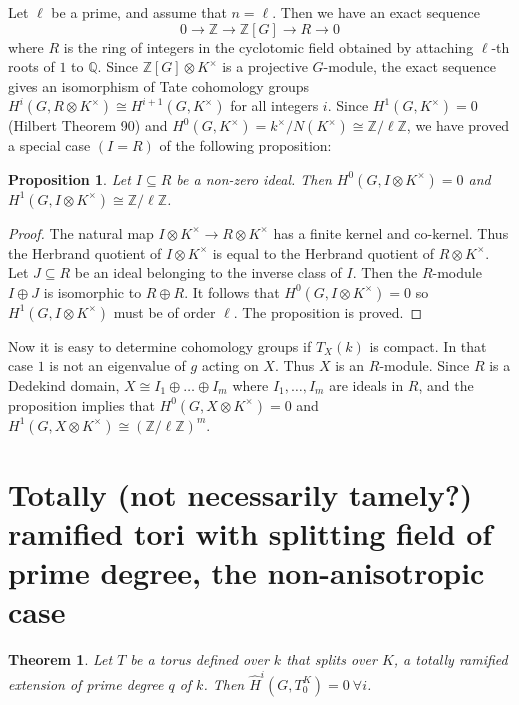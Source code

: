 \documentclass[11pt]{amsart}
\theoremstyle{plain}
\newtheorem{theorem}[enumi]{Theorem}
\newtheorem{proposition}[enumi]{Proposition}
\begin{document}
Let $\ell$ be a prime, and assume that $n=\ell$. Then we have an exact sequence
\[
0 \rightarrow \mathbb Z \rightarrow \mathbb Z[G]\rightarrow R \rightarrow 0
\]
where $R$ is the ring of integers in the cyclotomic field obtained by attaching $\ell$-th roots
of $1$ to $\mathbb Q$. Since $\mathbb Z[G]\otimes K^{\times}$ is a projective $G$-module, the exact sequence
gives an isomorphism of Tate cohomology
groups $H^i(G, R\otimes K^{\times})\cong H^{i+1}(G,K^{\times})$ for all integers $i$. Since
$H^1(G,K^{\times})=0$ (Hilbert Theorem 90) and $H^{0}(G,K^{\times})=k^{\times}/N(K^{\times})
\cong \mathbb Z/\ell\mathbb Z$, we have proved a special case $(I=R)$ of the following
proposition:

\begin{proposition} Let $I\subseteq R$ be a non-zero ideal. Then $H^0(G,I\otimes K^{\times})=0$
and $H^1(G,I\otimes K^{\times})\cong \mathbb Z/\ell\mathbb Z$.
\end{proposition}
\begin{proof} The natural map $I\otimes K^{\times}\rightarrow R\otimes K^{\times}$ has a
finite kernel and co-kernel. Thus the Herbrand quotient of
$I\otimes K^{\times}$ is equal to the Herbrand quotient of $R \otimes K^{\times}$. Let
$J\subseteq R$ be an ideal belonging to the inverse class of $I$. Then the $R$-module
$I\oplus J$ is isomorphic to $R\oplus R$. It follows that $H^0(G,I\otimes K^{\times})=0$
so $H^1(G,I\otimes K^{\times})$ must be of order $\ell$. The proposition is proved.
\end{proof}

Now it is easy to determine cohomology groups if $T_X(k)$ is compact. In that case $1$ is not
an eigenvalue of $g$ acting on $X$. Thus $X$ is an $R$-module. Since $R$ is a Dedekind
domain, $X\cong I_1\oplus \ldots \oplus I_m$ where $I_1, \ldots, I_m$ are ideals in $R$, and
the proposition implies that $H^0(G,X\otimes K^{\times})=0$
and $H^1(G,X\otimes K^{\times})\cong (\mathbb Z/\ell\mathbb Z)^m$.

\vskip 10pt

\section{Totally (not necessarily tamely?) ramified tori with splitting field of prime degree, the non-anisotropic case}

\begin{theorem}
Let $T$ be a torus defined over $k$ that splits over $K$, a totally ramified extension of prime degree $q$ of $k$.  Then $\hat{H}^i(G, T_0^K) = 0 \ \forall i$.
\end{theorem}
\end{document}
